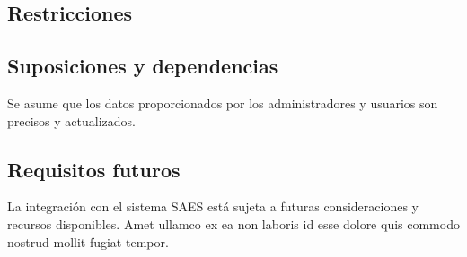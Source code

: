 \subsection{Restricciones}

\subsection{Suposiciones y dependencias}
Se asume que los datos proporcionados por los administradores y usuarios son precisos y actualizados.

\subsection{Requisitos futuros}
La integración con el sistema SAES está sujeta a futuras consideraciones y recursos disponibles.
Amet ullamco ex ea non laboris id esse dolore quis commodo nostrud mollit fugiat tempor.